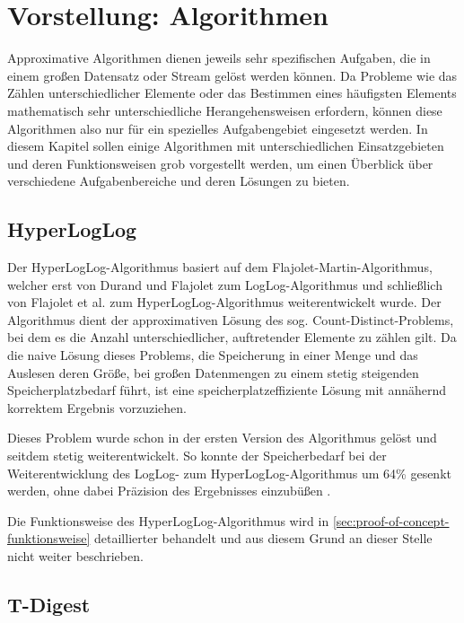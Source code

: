 \section{Vorstellung: Algorithmen}

Approximative Algorithmen dienen jeweils sehr spezifischen Aufgaben, die in einem großen Datensatz oder Stream gelöst werden können.
Da Probleme wie das Zählen unterschiedlicher Elemente oder das Bestimmen eines häufigsten Elements mathematisch sehr unterschiedliche Herangehensweisen erfordern, können diese Algorithmen also nur für ein spezielles Aufgabengebiet eingesetzt werden.
In diesem Kapitel sollen einige Algorithmen mit unterschiedlichen Einsatzgebieten und deren Funktionsweisen grob vorgestellt werden, um einen Überblick über verschiedene Aufgabenbereiche und deren Lösungen zu bieten.

\subsection{HyperLogLog}

Der HyperLogLog-Algorithmus basiert auf dem Flajolet-Martin-Algorithmus, welcher erst von Durand und Flajolet \cite{durand2003} zum LogLog-Algorithmus und schließlich von Flajolet et al. \cite{flajolet2007} zum HyperLogLog-Algorithmus weiterentwickelt wurde.
Der Algorithmus dient der approximativen Lösung des sog. Count-Distinct-Problems, bei dem es die Anzahl unterschiedlicher, auftretender Elemente zu zählen gilt.
Da die naive Lösung dieses Problems, die Speicherung in einer Menge und das Auslesen deren Größe, bei großen Datenmengen zu einem stetig steigenden Speicherplatzbedarf führt, ist eine speicherplatzeffiziente Lösung mit annähernd korrektem Ergebnis vorzuziehen.

Dieses Problem wurde schon in der ersten Version des Algorithmus gelöst und seitdem stetig weiterentwickelt.
So konnte der Speicherbedarf bei der Weiterentwicklung des LogLog- zum HyperLogLog-Algorithmus um 64\% gesenkt werden, ohne dabei Präzision des Ergebnisses einzubüßen \cite{flajolet2007}.

Die Funktionsweise des HyperLogLog-Algorithmus wird in \autoref{sec:proof-of-concept-funktionsweise} detaillierter behandelt und aus diesem Grund an dieser Stelle nicht weiter beschrieben.

\subsection{T-Digest}

